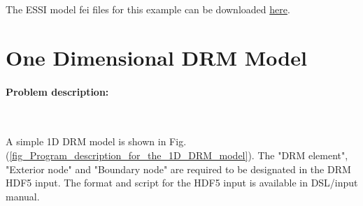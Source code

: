 The ESSI model fei files for this example can be downloaded 
\href{https://github.com/BorisJeremic/Real-ESSI-Examples/blob/master/model_fei_file/ANDESshell_square_plate/ANDESshell_square_plate.tgz?raw=true}{here}.

































\section{One Dimensional DRM Model}





\paragraph{Problem description:} ~


A simple 1D DRM model is shown in Fig.(\ref{fig_Program_description_for_the_1D_DRM_model}). 
The "DRM element", "Exterior node" and "Boundary node" are required
to be designated in the DRM HDF5 input. The format and script for the HDF5 input
is available in DSL/input manual.

